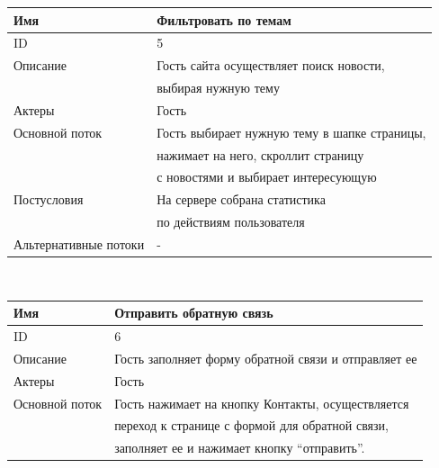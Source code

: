 \BgThispage
\begin{center}
    \small
    \begin{tabular}{|l|l|}
        \hline
        Имя                   & Фильтровать по темам                         \\
        \hline
        ID                    & 5                                            \\
        \hline
        Описание              & Гость сайта осуществляет поиск новости,      \\
        & выбирая нужную тему                          \\
        \hline
        Актеры                & Гость                                        \\
        \hline
        Основной поток        & Гость выбирает нужную тему в шапке страницы, \\
        & нажимает на него, скроллит страницу          \\
        & с новостями и выбирает интересующую          \\
        \hline
        Постусловия           & На сервере собрана статистика                \\
        & по действиям пользователя                    \\
        \hline
        Альтернативные потоки & -                                            \\
        \hline
    \end{tabular}\\
    \vspace{0.5cm}
    \begin{tabular}{|l|l|}
        \hline
        Имя                   & Отправить обратную связь                             \\
        \hline
        ID                    & 6                                                    \\
        \hline
        Описание              & Гость заполняет форму обратной связи и отправляет ее \\
        \hline
        Актеры                & Гость                                                \\
        \hline
        Основной поток        & Гость нажимает на кнопку Контакты, осуществляется    \\
        & переход к странице с формой для обратной связи,      \\
        & заполняет ее и нажимает кнопку “отправить”.          \\

\end{tabular}
\end{center}
